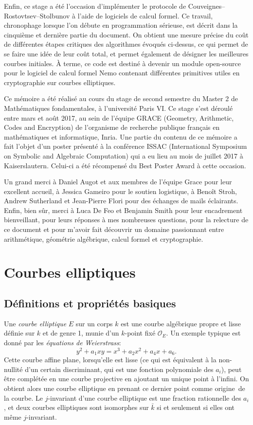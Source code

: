 \documentclass[11pt,a4paper]{article}
\renewcommand{\O}{\mathcal{O}}
\renewcommand{\v}{\vspace{5mm}}
\theoremstyle{definition}
\begin{document}
Enfin, ce stage a été l'occasion d'implémenter le protocole de Couveignes--Rostovtsev--Stolbunov à l'aide de logiciels de calcul formel. Ce travail, chronophage lorsque l'on débute en programmation sérieuse, est décrit dans la cinquième et dernière partie du document. On obtient une mesure précise du coût de différentes étapes critiques des algorithmes évoqués ci-dessus, ce qui permet de se faire une idée de leur coût total, et permet également de désigner les meilleures courbes initiales. À terme, ce code est destiné à devenir un module open-source pour le logiciel de calcul formel Nemo contenant différentes primitives utiles en cryptographie sur courbes elliptiques.

\v

Ce mémoire a été réalisé au cours du stage de second semestre du Master 2 de Mathématiques fondamentales, à l'université Paris VI. Ce stage s'est déroulé entre mars et août 2017, au sein de l'équipe GRACE (Geometry, Arithmetic, Codes and Encryption) de l'organisme de recherche publique français en mathématiques et informatique, Inria. Une partie du contenu de ce mémoire a fait l'objet d'un poster présenté à la conférence ISSAC (International Symposium on Symbolic and Algebraic Computation) qui a eu lieu au mois de juillet 2017 à Kaiserslautern. Celui-ci a été récompensé du Best Poster Award à cette occasion.

Un grand merci à Daniel Augot et aux membres de l'équipe Grace pour leur excellent accueil, à Jessica Gameiro pour le soutien logistique, à Benoît Stroh, Andrew Sutherland et Jean-Pierre Flori pour des échanges de mails éclairants. Enfin, bien sûr, merci à Luca De Feo et Benjamin Smith pour leur encadrement bienveillant, pour leurs réponses à mes nombreuses questions, pour la relecture de ce document et pour m'avoir fait découvrir un domaine passionnant entre arithmétique, géométrie algébrique, calcul formel et cryptographie.

\newpage

\section{Courbes elliptiques}


\subsection{Définitions et propriétés basiques}


Une \emph{courbe elliptique} $E$ sur un corps $k$ est une courbe algébrique propre et lisse définie sur $k$ et de genre 1, munie d'un $k$-point fixé $\O_E$. Un exemple typique est donné par les \emph{équations de Weierstrass}:
$$y^2 + a_1xy = x^3 + a_2x^2 + a_4 x + a_6.$$
Cette courbe affine plane, lorsqu'elle est lisse (ce qui est équivalent à la non-nullité d'un certain discriminant, qui est une fonction polynomiale des $a_i$), peut être complétée en une courbe projective en ajoutant un unique point à l'infini. On obtient alors une courbe elliptique en prenant ce dernier point comme \og origine\fg\ de la courbe. Le $j$-invariant d'une courbe elliptique est une fraction rationnelle des $a_i$, et deux courbes elliptiques sont isomorphes sur $\bar{k}$ si et seulement si elles ont même $j$-invariant.
\end{document}
